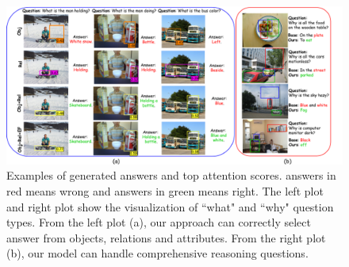 \documentclass[letterpaper]{article} %
\begin{document}

\begin{figure}[ht] 
    \vspace{-0.5in}
    \centering 
    \includegraphics[width=1\textwidth]{./pic/visual_aaai2.pdf} 
    \caption{Examples of generated answers and top attention scores. answers in red means wrong and answers in green means right. The left plot and right plot show the visualization of ``what" and ``why" question types. From the left plot (a), our approach can correctly select answer from objects, relations and attributes. From the right plot (b), our model can handle comprehensive reasoning questions.} 
    \label{visual} 
    \vspace{-0.1in}
\end{figure}
\end{document}
